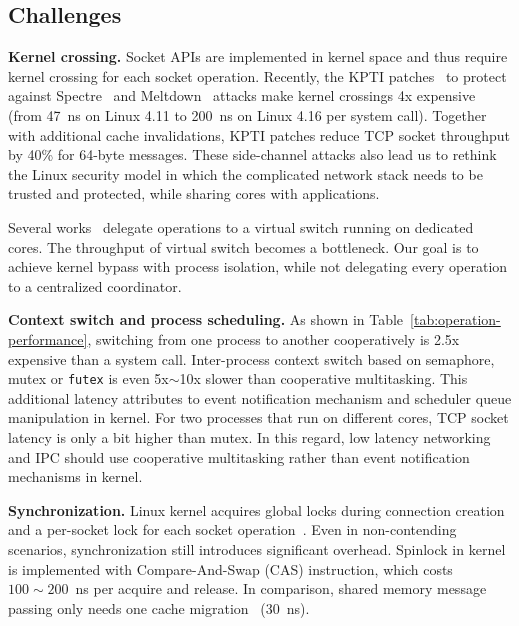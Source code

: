 \subsection{Challenges}
\label{subsec:challenges}

\textbf{Kernel crossing.}
Socket APIs are implemented in kernel space and thus require kernel crossing for each socket operation. Recently, the KPTI patches~\cite{kpti} to protect against Spectre~\cite{Kocher2018spectre} and Meltdown~\cite{Lipp2018meltdown} attacks make kernel crossings 4x expensive (from 47~ns on Linux 4.11 to 200~ns on Linux 4.16 per system call). Together with additional cache invalidations, KPTI patches reduce TCP socket throughput by 40\% for 64-byte messages. These side-channel attacks also lead us to rethink the Linux security model in which the complicated network stack needs to be trusted and protected, while sharing cores with applications.

Several works~\cite{martins2014clickos,roghanchi2017ffwd,huang2017high} delegate operations to a virtual switch running on dedicated cores. The throughput of virtual switch becomes a bottleneck. Our goal is to achieve kernel bypass with process isolation, while not delegating every operation to a centralized coordinator.

\textbf{Context switch and process scheduling.}
As shown in Table~\ref{tab:operation-performance}, switching from one process to another cooperatively is 2.5x expensive than a system call. Inter-process context switch based on semaphore, mutex or \texttt{futex} is even 5x$\sim$10x slower than cooperative multitasking. This additional latency attributes to event notification mechanism and scheduler queue manipulation in kernel. For two processes that run on different cores, TCP socket latency is only a bit higher than mutex. In this regard, low latency networking and IPC should use cooperative multitasking rather than event notification mechanisms in kernel.

\textbf{Synchronization.}
Linux kernel acquires global locks during connection creation and a per-socket lock for each socket operation~\cite{boyd2010analysis,han2012megapipe,lin2016scalable}. Even in non-contending scenarios, synchronization still introduces significant overhead. Spinlock in kernel is implemented with Compare-And-Swap (CAS) instruction, which costs $100\sim200$~ns per acquire and release. In comparison, shared memory message passing only needs one cache migration~\cite{roghanchi2017ffwd} (30~ns).

